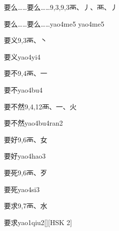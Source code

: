 \begin{entry}{要么……要么……}{9,3,9,3}{⾑、⼃、⾑、⼃}
  \begin{phonetics}{要么……要么……}{yao4me5 yao4me5}
  \end{phonetics}
\end{entry}

\begin{entry}{要义}{9,3}{⾑、⼂}
  \begin{phonetics}{要义}{yao4yi4}
  \end{phonetics}
\end{entry}

\begin{entry}{要不}{9,4}{⾑、⼀}
  \begin{phonetics}{要不}{yao4bu4}
  \end{phonetics}
\end{entry}

\begin{entry}{要不然}{9,4,12}{⾑、⼀、⽕}
  \begin{phonetics}{要不然}{yao4bu4ran2}
  \end{phonetics}
\end{entry}

\begin{entry}{要好}{9,6}{⾑、⼥}
  \begin{phonetics}{要好}{yao4hao3}
  \end{phonetics}
\end{entry}

\begin{entry}{要死}{9,6}{⾑、⽍}
  \begin{phonetics}{要死}{yao4si3}
  \end{phonetics}
\end{entry}

\begin{entry}{要求}{9,7}{⾑、⽔}
  \begin{phonetics}{要求}{yao1qiu2}[][HSK 2]
  \end{phonetics}
\end{entry}

